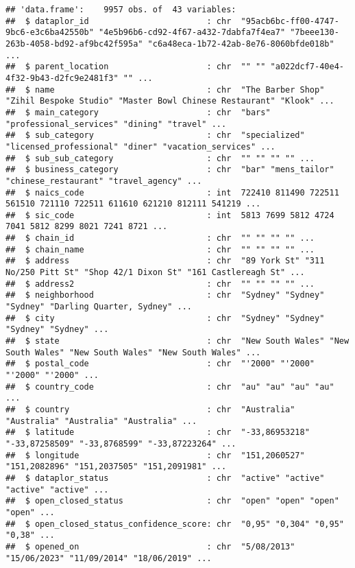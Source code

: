 \documentclass[
]{article}
\begin{document}
\begin{verbatim}
## 'data.frame':    9957 obs. of  43 variables:
##  $ dataplor_id                        : chr  "95acb6bc-ff00-4747-9bc6-e3c6ba42550b" "4e5b96b6-cd92-4f67-a432-7dabfa7f4ea7" "7beee130-263b-4058-bd92-af9bc42f595a" "c6a48eca-1b72-42ab-8e76-8060bfde018b" ...
##  $ parent_location                    : chr  "" "" "a022dcf7-40e4-4f32-9b43-d2fc9e2481f3" "" ...
##  $ name                               : chr  "The Barber Shop" "Zihil Bespoke Studio" "Master Bowl Chinese Restaurant" "Klook" ...
##  $ main_category                      : chr  "bars" "professional_services" "dining" "travel" ...
##  $ sub_category                       : chr  "specialized" "licensed_professional" "diner" "vacation_services" ...
##  $ sub_sub_category                   : chr  "" "" "" "" ...
##  $ business_category                  : chr  "bar" "mens_tailor" "chinese_restaurant" "travel_agency" ...
##  $ naics_code                         : int  722410 811490 722511 561510 721110 722511 611610 621210 812111 541219 ...
##  $ sic_code                           : int  5813 7699 5812 4724 7041 5812 8299 8021 7241 8721 ...
##  $ chain_id                           : chr  "" "" "" "" ...
##  $ chain_name                         : chr  "" "" "" "" ...
##  $ address                            : chr  "89 York St" "311 No/250 Pitt St" "Shop 42/1 Dixon St" "161 Castlereagh St" ...
##  $ address2                           : chr  "" "" "" "" ...
##  $ neighborhood                       : chr  "Sydney" "Sydney" "Sydney" "Darling Quarter, Sydney" ...
##  $ city                               : chr  "Sydney" "Sydney" "Sydney" "Sydney" ...
##  $ state                              : chr  "New South Wales" "New South Wales" "New South Wales" "New South Wales" ...
##  $ postal_code                        : chr  "'2000" "'2000" "'2000" "'2000" ...
##  $ country_code                       : chr  "au" "au" "au" "au" ...
##  $ country                            : chr  "Australia" "Australia" "Australia" "Australia" ...
##  $ latitude                           : chr  "-33,86953218" "-33,87258509" "-33,8768599" "-33,87223264" ...
##  $ longitude                          : chr  "151,2060527" "151,2082896" "151,2037505" "151,2091981" ...
##  $ dataplor_status                    : chr  "active" "active" "active" "active" ...
##  $ open_closed_status                 : chr  "open" "open" "open" "open" ...
##  $ open_closed_status_confidence_score: chr  "0,95" "0,304" "0,95" "0,38" ...
##  $ opened_on                          : chr  "5/08/2013" "15/06/2023" "11/09/2014" "18/06/2019" ...

\end{verbatim}
\end{document}
